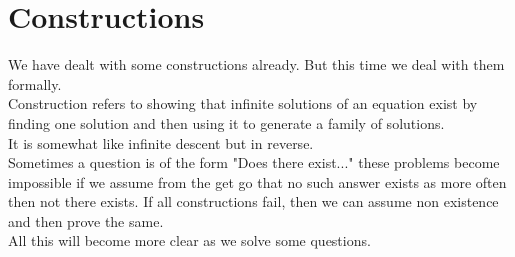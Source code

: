 \chapter{Constructions}
We have dealt with some constructions already. But this time we deal with them formally.\\
Construction refers to showing that infinite solutions of an equation exist by finding one solution and then using it to generate a family of solutions.\\
It is somewhat like infinite descent but in reverse.\\
Sometimes a question is of the form "Does there exist..." these problems become impossible if we assume from the get go that no such answer exists as more often then not there exists. If all constructions fail, then we can assume non existence and then prove the same.\\
All this will become more clear as we solve some questions.\\
